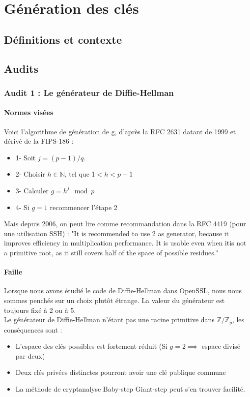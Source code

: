 \chapter{Génération des clés}
\section{Définitions et contexte}

\section{Audits}
	\subsection{Audit 1 : Le générateur de Diffie-Hellman}
		\subsubsection{Normes visées}

		Voici l'algorithme de génération de g, d'après la RFC 2631 \cite{rfc2631} datant de 1999 et dérivé de la FIPS-186 : 
		\begin{itemize}
		\item 1- Soit $j = (p - 1)/q$.
		\item 2- Choisir $h \in \mathbb{N}$, tel que $1 < h < p - 1$
		\item 3- Calculer $g = h^j \mod p$
		\item 4- Si $g = 1$ recommencer l'étape 2\\
		\end{itemize}
	
		Mais depuis 2006, on peut lire comme recommandation dans la RFC 4419 (pour une utilisation SSH) : "It is recommended to use 2 as generator, because it improves	efficiency in multiplication performance.  It is usable even when itis not a primitive root, as it still covers half of the space of possible residues."\\
	
		\subsubsection{Faille}
	
		Lorsque nous avons étudié le code de Diffie-Hellman dans OpenSSL, nous nous	sommes penchés sur un choix plutôt étrange. La valeur du générateur est toujours fixé à 2 ou à 5. \\
	
		Le générateur de Diffie-Hellman n'étant pas une racine primitive dans $\mathbb{Z}/\mathbb{Z}_p$, les conséquences sont :
		\begin{itemize}
		\item L'espace des clés possibles est fortement réduit (Si $g=2 \implies$ espace divisé par deux)
		\item Deux clés privées distinctes pourront avoir une clé publique commune
		\item La méthode de cryptanalyse Baby-step Giant-step peut s'en trouver 
		facilité.\\
		\end{itemize}
	
